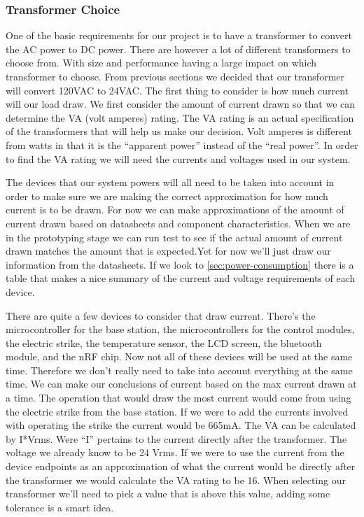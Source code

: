 \subsubsection{Transformer Choice}
One of the basic requirements for our project is to have a transformer to
convert the AC power to DC power. There are however a lot of different
transformers to choose from. With size and performance having a large impact on
which transformer to choose. From previous sections we decided that our
transformer will convert 120VAC to 24VAC. The first thing to consider is how
much current will our load draw. We first consider the amount of current drawn
so that we can determine the VA (volt amperes) rating. The VA rating is an
actual specification of the transformers that will help us make our decision.
Volt amperes is different from watts in that it is the {}``apparent power{}''
instead of the {}``real power{}''. In order to find the VA rating we will need the
currents and voltages used in our system.

The devices that our system powers will all need to be taken
into account in order to make sure we are making the correct approximation
for how much current is to be drawn. For now we can make approximations of
the amount of current drawn based on datasheets and component
characteristics. When we are in the prototyping stage we can run test to see
if the actual amount of current drawn matches the amount that is expected.Yet
for now we{}'ll just draw our information from the datasheets. If we look to
\autoref{sec:power-consumption} there is a table that makes a nice summary of the
current and voltage requirements of each device.

There are quite a few devices to consider that draw current.
There{}'s the microcontroller for the base station, the microcontrollers for
the control modules, the electric strike, the temperature sensor, the LCD
screen, the bluetooth module, and the nRF chip. Now not all of these devices
will be used at the same time. Therefore we don{}'t really need to take into
account everything at the same time. We can make our conclusions of current
based on the max current drawn at a time. The operation that would draw the
most current would come from using the electric strike from the base station.
If we were to add the currents involved with operating the strike the current
would be 665mA. The VA can be calculated by I*Vrms. Were {}``I{}'' pertains
to the current directly after the transformer. The voltage we already know to
be 24 Vrms. If we were to use the current from the device endpoints as an
approximation of what the current would be directly after the transformer we
would calculate the VA rating to be 16. When selecting our transformer we{}'ll
need to pick a value that is above this value, adding some tolerance is a smart
idea.

